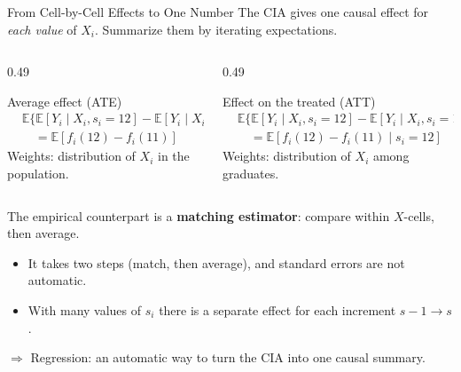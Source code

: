 \documentclass[aspectratio=169,11pt]{beamer}
\newcommand{\E}{\mathbb{E}}
\begin{document}
\begin{frame}{From Cell-by-Cell Effects to One Number}
\small
The CIA gives one causal effect for \emph{each value} of $X_i$. Summarize them by iterating expectations.
\begin{columns}[T]
\begin{column}{0.49\textwidth}
\begin{block}{Average effect (ATE)}
\vspace{-0.6em}
\[
\begin{aligned}
&\E\big\{\E[Y_i\mid X_i,s_i{=}12]-\E[Y_i\mid X_i,s_i{=}11]\big\}\\
&\quad=\E[f_i(12)-f_i(11)]
\end{aligned}
\]
Weights: distribution of $X_i$ in the population.
\end{block}
\end{column}
\begin{column}{0.49\textwidth}
\begin{block}{Effect on the treated (ATT)}
\vspace{-0.6em}
\[
\begin{aligned}
&\E\big\{\E[Y_i\mid X_i,s_i{=}12]-\E[Y_i\mid X_i,s_i{=}11]\,\big|\,s_i{=}12\big\}\\
&\quad=\E[f_i(12)-f_i(11)\mid s_i=12]
\end{aligned}
\]
Weights: distribution of $X_i$ among graduates.
\end{block}
\end{column}
\end{columns}
\medskip
The empirical counterpart is a \textbf{matching estimator}: compare within $X$-cells, then average.
\begin{itemize}
\item It takes two steps (match, then average), and standard errors are not automatic.
\item With many values of $s_i$ there is a separate effect for each increment $s-1\to s$.
\end{itemize}
\alert{$\Rightarrow$ Regression: an automatic way to turn the CIA into one causal summary.}
\end{frame}

\end{document}
